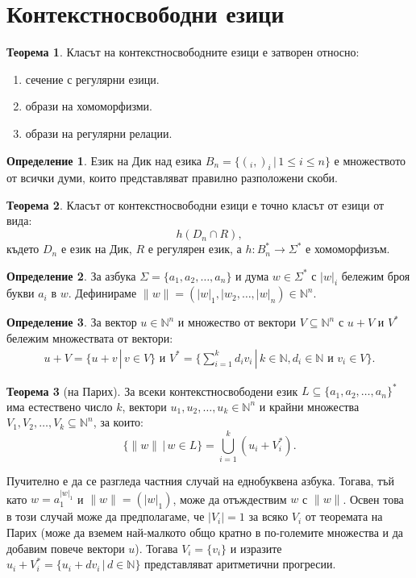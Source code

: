 \documentclass[a4paper]{article}
\theoremstyle{definition}
\newtheorem{theorem}{Теорема}
\newtheorem{definition}{Определение}
\let\oldmarginpar\marginpar
\renewcommand\marginpar[1]{\leavevmode\oldmarginpar{\raggedright\scriptsize #1}}
\begin{document}
\section{Контекстносвободни езици}
\begin{theorem}
Класът на контекстносвободните езици е затворен относно:
\begin{enumerate}
\item сечение с регулярни езици.
\item образи на хомоморфизми.
\item образи на регулярни релации.
\end{enumerate}
\end{theorem}
\begin{definition}
  \marginpar{На англ. Dyck. \cite{hopcroft} стр. 142}
  Език на Дик над езика $B_n=\{(_i,)_i\,|\, 1\le i\le n\}$ е множеството от всички
  думи, които представляват правилно разположени скоби.
\end{definition}
\begin{theorem}
Класът от контекстносвободни езици е точно класът от езици от вида:
\begin{equation*}
h(D_n \cap R),
\end{equation*}
където $D_n$ е език на Дик, $R$ е регулярен език, а $h:B_n^*\rightarrow\Sigma^*$ е хомоморфизъм.
\end{theorem}
\begin{definition}
За азбука $\Sigma=\{a_1,a_2,\dots,a_n\}$ и дума $w\in \Sigma^*$ с $|w|_i$ бележим броя букви $a_i$ в $w$.
Дефинираме $\|w\|=(|w|_1,|w_2,\dots,|w|_n)\in \mathbb{N}^n$.
\end{definition}
\begin{definition}
За вектор $u\in \mathbb{N}^n$ и множество от вектори $V\subseteq \mathbb{N}^n$ с $u+ V$ и $V^*$ бележим множествата от вектори:
\begin{eqnarray*}
u+V = \{u+v\,|\, v\in V\} \text{ и } V^*=\{\sum_{i=1}^k d_iv_i\,|\, k\in \mathbb{N}, d_i\in \mathbb{N}\text{ и } v_i\in V\}.
\end{eqnarray*}
\end{definition}
\begin{theorem}[на Парих] За всеки контекстносвободени език $L\subseteq \{a_1,a_2,\dots,a_n\}^*$ има
естествено число $k$, вектори $u_1,u_2,\dots,u_k\in \mathbb{N}^n$ и крайни множества $V_1,V_2,\dots,V_k\subseteq \mathbb{N}^n$,
за които:
\begin{equation*}
\{\|w\|\,|\, w\in L\} = \bigcup_{i=1}^k (u_i + V_i^*).
\end{equation*}
\end{theorem}
Пучително е да се разгледа частния случай на еднобуквена азбука. Тогава, тъй като $w=a_1^{|w|_1}$ и $\|w\|=(|w|_1)$,
може да отъждествим $w$ с $\|w\|$. Освен това в този случай може да предполагаме, че $|V_i|=1$ за всяко $V_i$ от теоремата
на Парих (може да вземем най-малкото общо кратно в по-големите множества и да добавим повече вектори $u$). Тогава
$V_i=\{v_i\}$ и изразите $u_i+V_i^*=\{u_i+dv_i \,|\, d\in \mathbb{N}\}$ представляват аритметични прогресии. 
\end{document}
